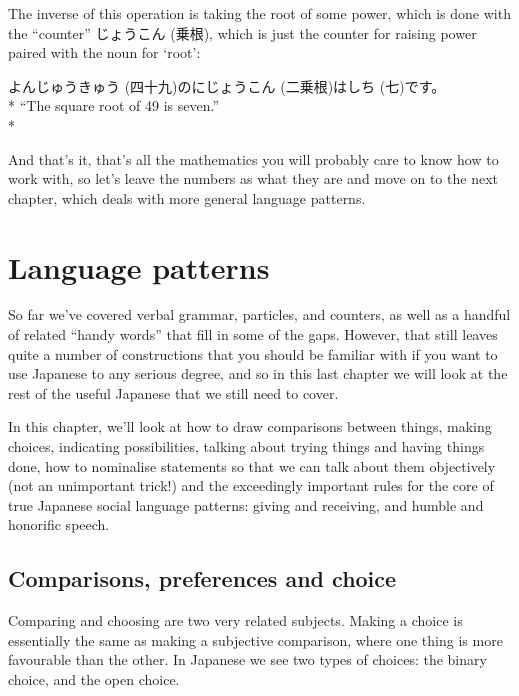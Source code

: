 \documentclass[11pt, b5paper, twoside, openright, onecolumn]{book}
\makeatletter
\newcommand*{\rubystack}[2]{{\relscale{0.5}%
  \begin{tabular}[b]{@{}c@{}}%
    {#1}\\%
   {\textscale{2}{#2}}%
  \end{tabular}}%
}
\DeclareRobustCommand*{\ruby}[2]{%
  \mbox{%
    \setlength{\parskip}{0ex}%
    \BeginAccSupp{method=pdfstringdef,ActualText={#1}}%
      \rubystack{\phantom{#2}}{#1}%
      \llap{%
        \rubystack{#2}{\phantom{#1}}%
      }%
    \EndAccSupp{}%
  }%
}
\renewcommand*{\ruby}[2]{#2 (#1)}%
\newenvironment{exampleblock}{
\setlength{\parindent}{0.6in}
\begin{minipage}[t]{\dimexpr\textwidth-\parindent}}
{\end{minipage}}
\makeatother
\begin{document}
The inverse of this operation is taking the root of some power‚ which is done with the “counter” \ruby{乗根}{じょうこん}‚ which is just the counter for raising power paired with the noun for ‘root’:

\vspace{0.4cm}
\begin{exampleblock}
\ruby{四十九}{よんじゅうきゅう}の\ruby{二乗根}{にじょうこん}は\ruby{七}{しち}です。 \\* 
“The square root of 49 is seven.” \\* 
\end{exampleblock}
\vspace{0.2cm}

And that’s it‚ that’s all the mathematics you will probably care to know how to work with‚ so let’s leave the numbers as what they are and move on to the next chapter‚ which deals with more general language patterns.


\chapter{Language patterns}

So far we’ve covered verbal grammar‚ particles‚ and counters‚ as well as a handful of related “handy words” that fill in some of the gaps. However‚ that still leaves quite a number of constructions that you should be familiar with if you want to use Japanese to any serious degree‚ and so in this last chapter we will look at the rest of the useful Japanese that we still need to cover.

In this chapter‚ we’ll look at how to draw comparisons between things‚ making choices‚ indicating possibilities‚ talking about trying things and having things done‚ how to nominalise statements so that we can talk about them objectively (not an unimportant trick!) and the exceedingly important rules for the core of true Japanese social language patterns: giving and receiving‚ and humble and honorific speech.

\section{Comparisons‚ preferences and choice}

Comparing and choosing are two very related subjects. Making a choice is essentially the same as making a subjective comparison‚ where one thing is more favourable than the other. In Japanese we see two types of choices: the binary choice‚ and the open choice.
\end{document}
